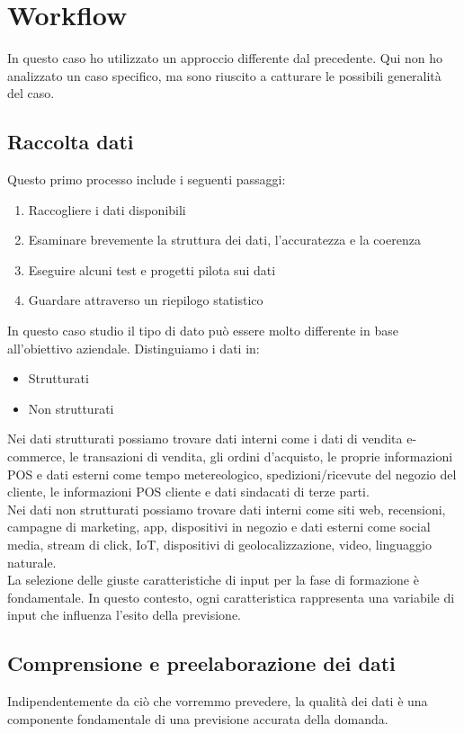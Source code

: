 \documentclass[12pt,a4paper]{report}
\begin{document}
\section{Workflow}
In questo caso ho utilizzato un approccio differente dal precedente. Qui non ho analizzato un caso specifico, ma sono riuscito a catturare le possibili generalità del caso.

\subsection{Raccolta dati}
Questo primo processo include i seguenti passaggi:
\begin{enumerate}
    \item Raccogliere i dati disponibili
    \item Esaminare brevemente la struttura dei dati, l'accuratezza e la coerenza
    \item Eseguire alcuni test e progetti pilota sui dati
    \item Guardare attraverso un riepilogo statistico
\end{enumerate}

In questo caso studio il tipo di dato può essere molto differente in base all'obiettivo aziendale. Distinguiamo i dati in:
\begin{itemize}
    \item Strutturati
    \item Non strutturati
\end{itemize}

Nei dati strutturati possiamo trovare dati interni come i dati di vendita e-commerce, le transazioni di vendita, gli ordini d'acquisto, le proprie informazioni POS e dati esterni come tempo metereologico, spedizioni/ricevute del negozio del cliente, le informazioni POS cliente e dati sindacati di terze parti.\\
Nei dati non strutturati possiamo trovare dati interni come siti web, recensioni, campagne di marketing, app, dispositivi in negozio e dati esterni come social media, stream di click, IoT, dispositivi di geolocalizzazione, video, linguaggio naturale.\\
La selezione delle giuste caratteristiche di input per la fase di formazione è fondamentale. In questo contesto, ogni caratteristica rappresenta una variabile di input che influenza l'esito della previsione. 

\subsection{Comprensione e preelaborazione dei dati}
Indipendentemente da ciò che vorremmo prevedere, la qualità dei dati è una componente fondamentale di una previsione accurata della domanda.
\end{document}
